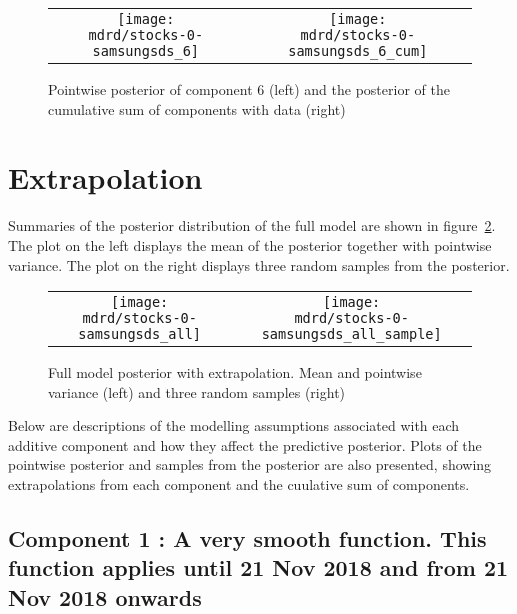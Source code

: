 \documentclass{article} %
\begin{document}
\begin{figure}[H]
\newcommand{\wmgd}{0.5\columnwidth}
\newcommand{\hmgd}{3.0cm}
\newcommand{\mdrd}{stocks-0-samsungsds}
\newcommand{\mbm}{\hspace{-0.3cm}}
\begin{tabular}{cc}
\mbm \texttt{[image: \\mdrd/stocks-0-samsungsds\_6]} & \texttt{[image: \\mdrd/stocks-0-samsungsds\_6\_cum]}
\end{tabular}
\caption{Pointwise posterior of component 6 (left) and the posterior of the cumulative sum of components with data (right)}
\label{fig:comp6}
\end{figure}

\section{Extrapolation}
\label{sec:extrap}

Summaries of the posterior distribution of the full model are shown in figure~\ref{fig:extrap}.
The plot on the left displays the mean of the posterior together with pointwise variance.
The plot on the right displays three random samples from the posterior.

\begin{figure}[H]
\newcommand{\wmgd}{0.5\columnwidth}
\newcommand{\hmgd}{3.0cm}
\newcommand{\mdrd}{stocks-0-samsungsds}
\newcommand{\mbm}{\hspace{-0.3cm}}
\begin{tabular}{cc}
\mbm \texttt{[image: \\mdrd/stocks-0-samsungsds\_all]} & \texttt{[image: \\mdrd/stocks-0-samsungsds\_all\_sample]}
\end{tabular}
\caption{Full model posterior with extrapolation. Mean and pointwise variance (left) and three random samples (right)}
\label{fig:extrap}
\end{figure}

Below are descriptions of the modelling assumptions associated with each additive component and how they affect the predictive posterior.
Plots of the pointwise posterior and samples from the posterior are also presented, showing extrapolations from each component and the cuulative sum of components.

\subsection{Component 1 : A very smooth function. This function applies until 21 Nov 2018 and from 21 Nov 2018 onwards}
\end{document}
